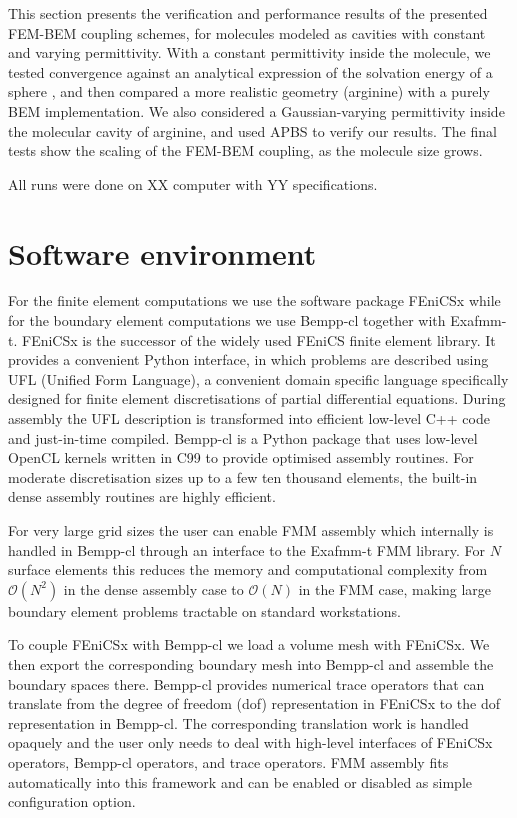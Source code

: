 This section presents the verification and performance results of the presented FEM-BEM coupling schemes, for molecules modeled as cavities with constant and varying permittivity.
With a constant permittivity inside the molecule, we tested convergence against an analytical expression of the solvation energy of a sphere \cite{Kirkwood1934}, and then compared a more realistic geometry (arginine) with a purely BEM implementation.
We also considered a Gaussian-varying permittivity\cite{grant2001smooth,li2013dielectric} inside the molecular cavity of arginine, and used APBS \cite{BakerETal2001} to verify our results.
The final tests show the scaling of the FEM-BEM coupling, as the molecule size grows. 

All runs were done on XX computer with YY specifications. 

\section*{\sffamily \Large Software environment}

For the finite element computations we use the software package FEniCSx while for the boundary element computations we use Bempp-cl together with Exafmm-t. FEniCSx is the successor of the widely used FEniCS finite element library.
It provides a convenient Python interface, in which problems are described using UFL (Unified Form Language), a convenient domain specific language specifically designed for finite element discretisations of partial differential equations. During assembly the UFL description is transformed into efficient low-level C++ code and just-in-time compiled. Bempp-cl is a Python package that uses low-level OpenCL kernels written in C99 to provide optimised assembly routines. For moderate discretisation sizes up to a few ten thousand elements, the built-in dense assembly routines are highly efficient.

For very large grid sizes the user can enable FMM assembly which internally is handled in Bempp-cl through an interface to the Exafmm-t FMM library. For $N$ surface elements this reduces the memory and computational complexity from $\mathcal{O}(N^2)$ in the dense assembly case to $\mathcal{O}(N)$ in the FMM case, making large boundary element problems tractable on standard workstations.

To couple FEniCSx with Bempp-cl we load a volume mesh with FEniCSx. We then export the corresponding boundary mesh into Bempp-cl and assemble the boundary spaces there. Bempp-cl provides numerical trace operators that can translate from the degree of freedom (dof) representation in FEniCSx to the dof representation in Bempp-cl. The corresponding translation work is handled opaquely and the user only needs to deal with high-level interfaces of FEniCSx operators, Bempp-cl operators, and trace operators. FMM assembly fits automatically into this framework and can be enabled or disabled as simple configuration option.

